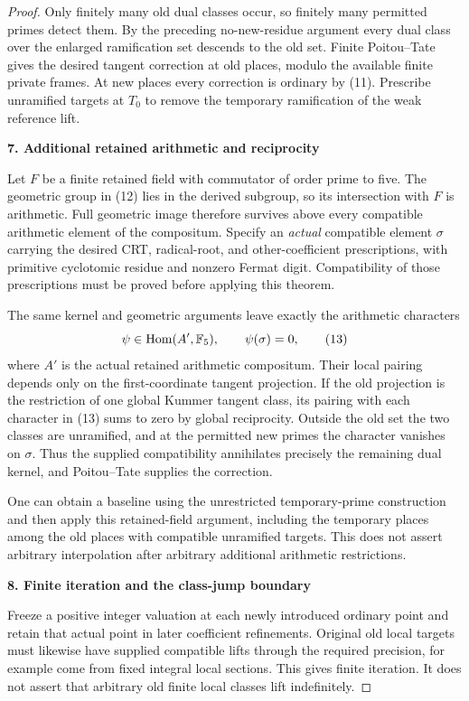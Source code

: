 \begin{proof}
Only finitely many old dual classes occur, so finitely many permitted primes detect them. By the preceding no-new-residue argument every dual class over the enlarged ramification set descends to the old set. Finite Poitou--Tate gives the desired tangent correction at old places, modulo the available finite private frames. At new places every correction is ordinary by (11). Prescribe unramified targets at $T_0$ to remove the temporary ramification of the weak reference lift.

\par\medskip\noindent\textbf{7. Additional retained arithmetic and reciprocity}\par\nobreak\smallskip
Let $F$ be a finite retained field with commutator of order prime to five. The geometric group in (12) lies in the derived subgroup, so its intersection with $F$ is arithmetic. Full geometric image therefore survives above every compatible arithmetic element of the compositum. Specify an \emph{actual} compatible element $\sigma$ carrying the desired CRT, radical-root, and other-coefficient prescriptions, with primitive cyclotomic residue and nonzero Fermat digit. Compatibility of those prescriptions must be proved before applying this theorem.

The same kernel and geometric arguments leave exactly the arithmetic characters
\[
 \psi\in\operatorname{Hom}(A',\mathbb F_5),\qquad \psi(\sigma)=0,
 \tag{13}
\]
where $A'$ is the actual retained arithmetic compositum. Their local pairing depends only on the first-coordinate tangent projection. If the old projection is the restriction of one global Kummer tangent class, its pairing with each character in (13) sums to zero by global reciprocity. Outside the old set the two classes are unramified, and at the permitted new primes the character vanishes on $\sigma$. Thus the supplied compatibility annihilates precisely the remaining dual kernel, and Poitou--Tate supplies the correction.

One can obtain a baseline using the unrestricted temporary-prime construction and then apply this retained-field argument, including the temporary places among the old places with compatible unramified targets. This does not assert arbitrary interpolation after arbitrary additional arithmetic restrictions.

\par\medskip\noindent\textbf{8. Finite iteration and the class-jump boundary}\par\nobreak\smallskip
Freeze a positive integer valuation at each newly introduced ordinary point and retain that actual point in later coefficient refinements. Original old local targets must likewise have supplied compatible lifts through the required precision, for example come from fixed integral local sections. This gives finite iteration. It does not assert that arbitrary old finite local classes lift indefinitely.


\end{proof}
